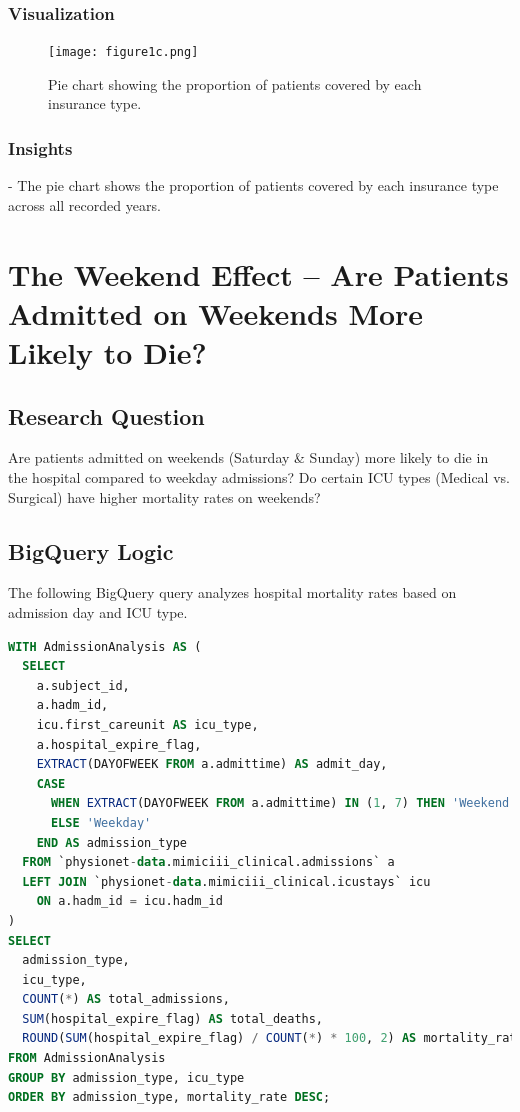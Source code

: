 \documentclass[a4paper,10pt]{article}
\begin{document}
\subsubsection{Visualization}

\begin{figure}[h]
    \centering
    \texttt{[image: figure1c.png]}
    \caption{Pie chart showing the proportion of patients covered by each insurance type.}
    \label{fig:pie_chart}
\end{figure}

\subsubsection{Insights}
- The pie chart shows the proportion of patients covered by each insurance type across all recorded years.

\section{The Weekend Effect – Are Patients Admitted on Weekends More Likely to Die?}

\subsection{Research Question}
Are patients admitted on weekends (Saturday \& Sunday) more likely to die in the hospital compared to weekday admissions? Do certain ICU types (Medical vs. Surgical) have higher mortality rates on weekends?

\subsection{BigQuery Logic}
The following BigQuery query analyzes hospital mortality rates based on admission day and ICU type.

\begin{lstlisting}[language=SQL]
%%bigquery df --project bigaquery-aihc-assign1
WITH AdmissionAnalysis AS (
  SELECT 
    a.subject_id,
    a.hadm_id,
    icu.first_careunit AS icu_type,
    a.hospital_expire_flag,
    EXTRACT(DAYOFWEEK FROM a.admittime) AS admit_day,
    CASE 
      WHEN EXTRACT(DAYOFWEEK FROM a.admittime) IN (1, 7) THEN 'Weekend'
      ELSE 'Weekday'
    END AS admission_type
  FROM `physionet-data.mimiciii_clinical.admissions` a
  LEFT JOIN `physionet-data.mimiciii_clinical.icustays` icu 
    ON a.hadm_id = icu.hadm_id
)
SELECT 
  admission_type,
  icu_type,
  COUNT(*) AS total_admissions,
  SUM(hospital_expire_flag) AS total_deaths,
  ROUND(SUM(hospital_expire_flag) / COUNT(*) * 100, 2) AS mortality_rate
FROM AdmissionAnalysis
GROUP BY admission_type, icu_type
ORDER BY admission_type, mortality_rate DESC;
\end{lstlisting}
\end{document}
